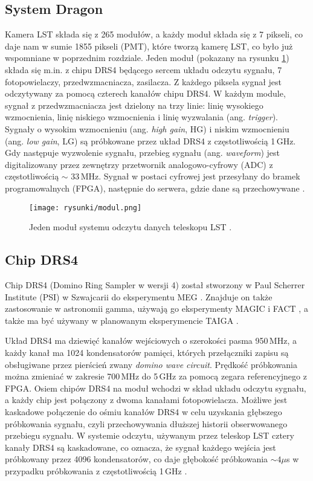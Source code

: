 \documentclass[a4paper,11pt,twoside]{article}
\begin{document}
\subsection{System Dragon}
Kamera LST składa się z 265 modułów, a każdy moduł składa się z 7 pikseli, co daje nam w sumie 1855 pikseli (PMT), które tworzą kamerę LST, co było już wspomniane w poprzednim rozdziale. Jeden moduł (pokazany na rysunku \ref{fig:drs4}) składa się m.in. z chipu DRS4 będącego sercem układu odczytu sygnału, 7 fotopowielaczy, przedwzmacniacza, zasilacza.
Z każdego piksela sygnał jest odczytywany za pomocą czterech kanałów chipu DRS4. W każdym module, sygnał z przedwzmacniacza jest dzielony na trzy linie: linię wysokiego wzmocnienia, linię niskiego wzmocnienia i linię wyzwalania (ang. \textsl{trigger}). Sygnały o wysokim wzmocnieniu (ang. \textsl{high gain}, HG) i niskim wzmocnieniu (ang. \textsl{low gain}, LG) są próbkowane przez układ DRS4 z częstotliwością 1\,GHz. Gdy następuje wyzwolenie sygnału, przebieg sygnału (ang. \textsl{waveform}) jest digitalizowany przez zewnętrzy przetwornik analogowo-cyfrowy (ADC) z częstotliwością $\sim$ 33\,MHz. Sygnał w postaci cyfrowej jest przesyłany do bramek programowalnych (FPGA), następnie do serwera, gdzie dane są przechowywane \cite{dragon_lst}. 
\begin{figure}[H] 
\centering
\texttt{[image: rysunki/modul.png]}
\caption{Jeden moduł systemu odczytu danych teleskopu LST \cite{lst_report}.}
\label{fig:drs4}
\end{figure}
\subsection{Chip DRS4}
Chip DRS4 (Domino Ring Sampler w wersji 4) został stworzony w Paul Scherrer Institute (PSI) w Szwajcarii do eksperymentu MEG \cite{meg_experiment}.
Znajduje on także zastosowanie w astronomii gamma, używają go eksperymenty MAGIC \cite{magic_hardware} i FACT \cite{fact}, a także ma być używany w planowanym eksperymencie TAIGA \cite{tunka}.

Układ DRS4 ma dziewięć kanałów wejściowych o szerokości pasma 950\,MHz, a każdy kanał ma 1024 kondensatorów pamięci, których przełączniki zapisu są obsługiwane przez pierścień zwany \textsl{domino wave circuit}. Prędkość próbkowania można zmieniać w zakresie 700\,MHz do 5\,GHz za pomocą zegara referencyjnego z FPGA. Osiem chipów DRS4 na moduł wchodzi w skład układu odczytu sygnału, a każdy chip jest połączony z dwoma kanałami fotopowielacza. Możliwe jest kaskadowe połączenie do ośmiu kanałów DRS4 w celu uzyskania głębszego próbkowania sygnału, czyli przechowywania dłuższej historii obserwowanego przebiegu sygnału. W systemie odczytu, używanym przez teleskop LST cztery kanały DRS4 są kaskadowane, co oznacza, że sygnał każdego wejścia jest próbkowany przez 4096 kondensatorów, co daje głębokość próbkowania $\sim 4 \mathtt{\mu}$s w przypadku próbkowania z częstotliwością 1\,GHz \cite{dragon_lst}.
\end{document}
